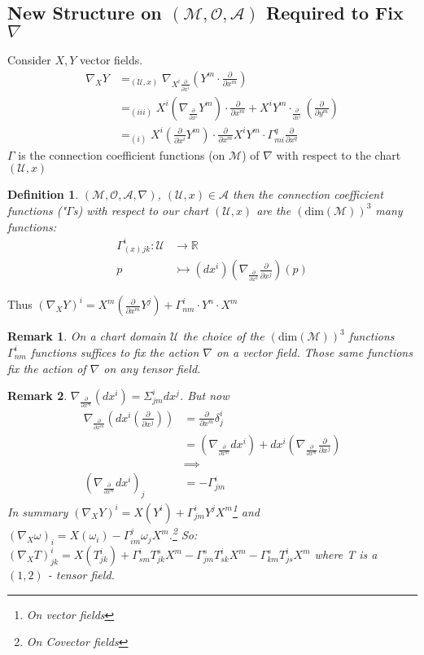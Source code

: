 \documentclass[10pt, oneside]{article}
\newcommand{\R}{\mathbb{R}}
\newcommand{\M}{\mathcal{M}}
\newtheorem{defn}{Definition}
\newtheorem{remark}{Remark}
\begin{document}
  \subsection*{New Structure on $(\M, \mathcal{O}, \mathcal{A})$ Required to Fix $\nabla$}
     Consider $X,Y$ vector fields.
     \begin{align*}
        \nabla_X Y &=_{(\mathcal{U},x)} \nabla_{X^i \frac{\partial}{\partial x^i}} (Y^m \cdot \frac{\partial}{\partial x^m}) \\
        &=_{(iii)} X^i (\nabla_{\frac{\partial}{\partial x^i}} Y^m) \cdot \frac{\partial}{\partial x^m} + X^i Y^m \cdot_{\frac{\partial}{\partial x^i}}(\frac{\partial}{\partial y^m}) \\
        &=_{(i)} X^i (\frac{\partial}{\partial x^i} Y^m) \cdot \frac{\partial}{\partial x^m} X^i Y^m \cdot \Gamma^q_{m i} \frac{\partial}{\partial x^q}
     \end{align*}
     $\Gamma$ is the connection coefficient functions (on $\M$) of $\nabla$ with respect to the chart $(\mathcal{U},x)$
     \begin{defn}
        $(\M,\mathcal{O},\mathcal{A},\nabla)$, $(\mathcal{U},x) \in \mathcal{A}$ then the connection coefficient functions ("$\Gamma$s) with respect to our chart $(\mathcal{U},x)$ are the $(\text{dim}(\M))^3$ many functions:
        \begin{align*}
           \Gamma_(x)^i_{jk}: \mathcal{U} &\to \R \\
           p & \rightarrowtail (dx^i)(\nabla_{\frac{\partial}{\partial x^k}} \frac{\partial}{\partial x^j})(p)
        \end{align*}
     \end{defn}
     Thus $(\nabla_X Y)^i = X^m (\frac{\partial}{\partial x^m} Y^j)+\Gamma^i_{nm} \cdot Y^n \cdot X^m$
     \begin{remark}
        On a chart domain $\mathcal{U}$ the choice of the $(\text{dim}(\M))^3$ functions $\Gamma^i_{n m}$ functions suffices to fix the action $\nabla$ on a vector field. Those same functions fix the action of $\nabla$ on any tensor field.
     \end{remark}
     \begin{remark}
        $\nabla_{\frac{\partial}{\partial x^m}} (dx^i) = \Sigma^i_{jm} dx^j$. But now
        \begin{align*}
           \nabla_{\frac{\partial}{\partial x^m}}(dx^i(\frac{\partial}{\partial x^j})) &= \frac{\partial}{\partial x^m} \delta^i_j \\
           &= (\nabla_{\frac{\partial}{\partial x^m}} dx^i) + dx^i (\nabla_{\frac{\partial}{\partial x^m}} \frac{\partial}{\partial x^j}) \\
           & \implies \\
           (\nabla_{\frac{\partial}{\partial x^m}} dx^i)_j &= - \Gamma^i_{jm}
        \end{align*}
        In summary $(\nabla_X Y)^i = X ( Y ^i) + \Gamma^i_{jm} Y^j X^m$\footnote{On vector fields} and $(\nabla_X \omega)_i = X(\omega_i) - \Gamma^j_{im} \omega_j X^m$.\footnote{On Covector fields}
        So: $(\nabla_X T)^i_{jk} = X(T^i_{jk})+\Gamma^i_{sm} T^s_{jk} X^m - \Gamma^s_{jm} T^i_{sk} X^m - \Gamma^s_{km} T^i_{js} X^m$ where T is a $(1,2)$ - tensor field.
     \end{remark}
\end{document}
